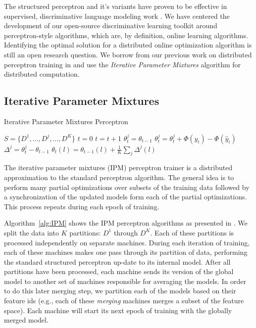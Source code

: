 \documentclass[a4paper]{article}
\begin{document}
The structured perceptron \cite{Collins02b} and it's variants have proven to
be effective in supervised, discriminative language modeling work
\cite{Roark07}.  We have centered the development of 
our open-source discriminative learning toolkit around perceptron-style
algorithms, which are, by definition, online learning algorithms. Identifying the
optimal solution for a distributed online optimization algorithm is still an open
research question. We borrow from our previous work on distributed perceptron
training in \cite{mcdonald10distributed,hall10distributed} and use the
\emph{Iterative Parameter Mixtures} algorithm for distributed computation.

\subsection{Iterative Parameter Mixtures}
\begin{algorithm}[h]
\scriptsize
\caption{Iterative Parameter Mixtures Perceptron}
\label{alg:IPM}
\begin{algorithmic}
  \State {}
  \State $S=\{D^{1},\ldots,D^{j},\ldots,D^{K}\}$ 
  \State $t=0$
  \Repeat
    \State $t=t+1$
     
      \State $\theta_{t}^{j}=\theta_{t-1}$
          \State {}
          \State $\theta_{t}^{j}=\theta_{t}^{j}+\Phi(y_{i})-\Phi(\hat{y}_{i})$
        \EndIf
      \EndFor
      \State $\Delta^{j}=\theta_{t}^{j}-\theta_{t-1}$
    \EndFor
     
      \State $\theta_{t}(l)=\theta_{t-1}(l)+\frac{1}{K}\sum_{j}\Delta^{j}(l)$
    \EndFor
   \end{algorithmic} 
\normalsize
\end{algorithm}

The iterative parameter mixtures (IPM) perceptron trainer is a distributed
approximation to the standard perceptron algorithm. The general idea
is to perform many partial optimizations over subsets of the training
data followed by a synchronization of the updated models form each of
the partial optimizations.  This process repeats during each epoch of training.

Algorithm~\ref{alg:IPM} shows the IPM perceptron algorithms as presented
in \cite{mcdonald10distributed}. We split the data into $K$
partitions: $D^{1}$ through $D^{K}$. Each of these
partitions is processed independently on separate machines. During each iteration
of training, each of these machines makes one pass through its partition
of data, performing the standard structured perceptron up-date to its internal
model.  After all partitions have been processed, each machine sends its
version of the global model to another set of machines responsible for averaging
the models.  In order to do this later
merging step, we partition each of the models based on their feature ids (e.g.,
each of these \emph{merging} machines merges a subset of the feature space).
Each machine will start its next epoch of training with the globally merged
model.
\end{document}
